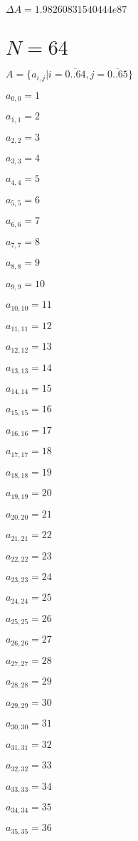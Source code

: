 \documentclass[a4paper,12pt]{article}
\begin{document}
$\Delta A = 1.98260831540444e87$



\section{ $N = 64$ }
$A = \{ a _{ i, j } | i = \overline { 0..64 }, j = \overline { 0..65 } \}$

$a _{ 0, 0 } = 1$

$a _{ 1, 1 } = 2$

$a _{ 2, 2 } = 3$

$a _{ 3, 3 } = 4$

$a _{ 4, 4 } = 5$

$a _{ 5, 5 } = 6$

$a _{ 6, 6 } = 7$

$a _{ 7, 7 } = 8$

$a _{ 8, 8 } = 9$

$a _{ 9, 9 } = 10$

$a _{ 10, 10 } = 11$

$a _{ 11, 11 } = 12$

$a _{ 12, 12 } = 13$

$a _{ 13, 13 } = 14$

$a _{ 14, 14 } = 15$

$a _{ 15, 15 } = 16$

$a _{ 16, 16 } = 17$

$a _{ 17, 17 } = 18$

$a _{ 18, 18 } = 19$

$a _{ 19, 19 } = 20$

$a _{ 20, 20 } = 21$

$a _{ 21, 21 } = 22$

$a _{ 22, 22 } = 23$

$a _{ 23, 23 } = 24$

$a _{ 24, 24 } = 25$

$a _{ 25, 25 } = 26$

$a _{ 26, 26 } = 27$

$a _{ 27, 27 } = 28$

$a _{ 28, 28 } = 29$

$a _{ 29, 29 } = 30$

$a _{ 30, 30 } = 31$

$a _{ 31, 31 } = 32$

$a _{ 32, 32 } = 33$

$a _{ 33, 33 } = 34$

$a _{ 34, 34 } = 35$

$a _{ 35, 35 } = 36$
\end{document}
